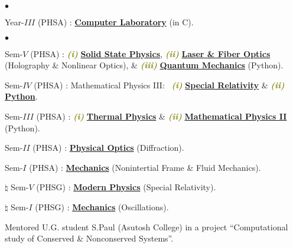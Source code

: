 \documentclass[margin,line]{res}
\newenvironment{list1}{
  \begin{list}{\ding{113}}{%
      \setlength{\itemsep}{0in}
      \setlength{\parsep}{0in} \setlength{\parskip}{0in}
      \setlength{\topsep}{0in} \setlength{\partopsep}{0in} 
      \setlength{\leftmargin}{0.17in}}}{\end{list}}
\newenvironment{list2}{
  \begin{list}{$\bullet$}{%
      \setlength{\itemsep}{0in}
      \setlength{\parsep}{0in} \setlength{\parskip}{0in}
      \setlength{\topsep}{0in} \setlength{\partopsep}{0in} 
      \setlength{\leftmargin}{0.2in}}}{\end{list}}
\begin{document}
\begin{resume}
\begin{list2}
\item Year-$III$ (PHSA) : \href{https://amitbny.github.io/akb.github.io/numerlabVIIIB.html}{\bf Computer Laboratory} (in C). 
\end{list2}
\begin{list1}
\item[] \textcolor{iris}{}
\vspace{1mm}
\end{list1}
\begin{list2}
\item Sem-$V$ (PHSA) : \textcolor{olive}{\textit{\textbf{(i)}}} 
                       \href{https://amitbny.github.io/akb.github.io/sem6H_SSP.html}{\bf Solid State Physics},
                       \textcolor{olive}{\textit{\textbf{(ii)}}} 
                       \href{https://amitbny.github.io/akb.github.io/sem5H_nloptics.html}{\bf Laser \& Fiber Optics} (Holography 
                       \& Nonlinear Optics), \& \textcolor{olive}{\textit{\textbf{(iii)}}} 
                       \href{https://amitbny.github.io/akb.github.io/sem4HB_numerlab.html}{\bf Quantum Mechanics} (Python).
\item Sem-$IV$ (PHSA) : Mathematical Physics III:~ \textcolor{olive}{\textit{\textbf{(i)}}} 
                        \href{https://amitbny.github.io/akb.github.io/sem4H_SR.html}{\bf Special Relativity} \&
                        \textcolor{olive}{\textit{\textbf{(ii)}}} 
                        \href{https://amitbny.github.io/akb.github.io/sem4HA_numerlab.html}{\bf Python}. 
\item Sem-$III$ (PHSA) : \textcolor{olive}{\textit{\textbf{(i)}}} 
                         \href{https://amitbny.github.io/akb.github.io/sem3H_thermal.html}{\bf Thermal Physics} \& 
                         \textcolor{olive}{\textit{\textbf{(ii)}}} 
                         \href{https://amitbny.github.io/akb.github.io/sem3H_numerlab.html}{\bf Mathematical Physics II} (Python). 
\item Sem-$II$ (PHSA) : \href{https://amitbny.github.io/akb.github.io/sem2H_wavesdiffr.html}{\bf Physical Optics} (Diffraction).
\item Sem-$I$ (PHSA) : \href{https://amitbny.github.io/akb.github.io/sem1H_fluidniner.html}{\bf Mechanics} (Nonintertial Frame \& Fluid Mechanics). 
\item[$\pmb{\natural}$] Sem-$V$ (PHSG) : \href{https://amitbny.github.io/akb.github.io/sem5G_SR.html}{\bf Modern Physics} (Special Relativity).
\item[$\pmb{\natural}$] Sem-$I$ (PHSG) : \href{https://amitbny.github.io/akb.github.io/sem1G_osc.html}{\bf Mechanics} (Oscillations). 
\item Mentored U.G. student S.Paul (Asutosh College) in a project ``{\sf Computational study of Conserved \& Nonconserved Systems}''. 
\end{list2}


\end{resume}
\end{document}
